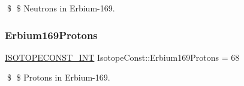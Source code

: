 \$ \$ Neutrons in Erbium-\/169. \mbox{\label{group___isotope_const-_erbium-_er169_gaf844d2bd4989f7b0185fe29240b3eb0f}} 
\subsubsection{\texorpdfstring{Erbium169\+Protons}{Erbium169Protons}}
{\footnotesize\ttfamily \mbox{\hyperlink{group___isotope_const-_macros_ga5f18360b3e99483a35c32d789e62621c}{I\+S\+O\+T\+O\+P\+E\+C\+O\+N\+S\+T\+\_\+\+I\+NT}} Isotope\+Const\+::\+Erbium169\+Protons = 68}

\$ \$ Protons in Erbium-\/169. 